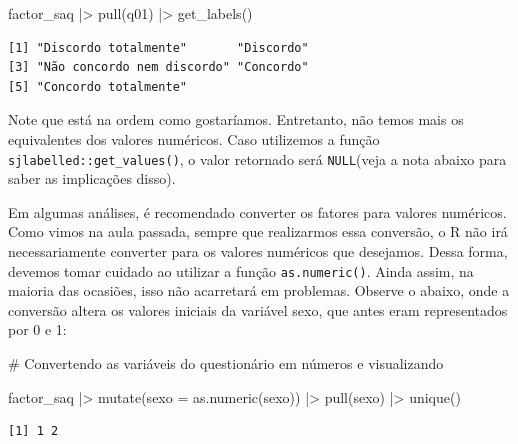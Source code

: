 \documentclass[
  letterpaper,
  DIV=11,
  numbers=noendperiod]{scrartcl}
\newenvironment{Shaded}{\begin{snugshade}}{\end{snugshade}}
\newcommand{\AttributeTok}[1]{\textcolor[rgb]{0.40,0.45,0.13}{#1}}
\newcommand{\CommentTok}[1]{\textcolor[rgb]{0.37,0.37,0.37}{#1}}
\newcommand{\FunctionTok}[1]{\textcolor[rgb]{0.28,0.35,0.67}{#1}}
\newcommand{\NormalTok}[1]{\textcolor[rgb]{0.00,0.23,0.31}{#1}}
\newcommand{\SpecialCharTok}[1]{\textcolor[rgb]{0.37,0.37,0.37}{#1}}
\begin{document}
\begin{Shaded}
\begin{Highlighting}[]
\NormalTok{factor\_saq }\SpecialCharTok{|\textgreater{}} 
  \FunctionTok{pull}\NormalTok{(q01) }\SpecialCharTok{|\textgreater{}} 
  \FunctionTok{get\_labels}\NormalTok{()}
\end{Highlighting}
\end{Shaded}

\begin{verbatim}
[1] "Discordo totalmente"       "Discordo"                 
[3] "Não concordo nem discordo" "Concordo"                 
[5] "Concordo totalmente"      
\end{verbatim}

Note que está na ordem como gostaríamos. Entretanto, não temos mais os
equivalentes dos valores numéricos. Caso utilizemos a função
\texttt{sjlabelled::get\_values()}, o valor retornado será
\texttt{NULL}(veja a nota abaixo para saber as implicações disso).

\begin{tcolorbox}[enhanced jigsaw, opacitybacktitle=0.6, bottomtitle=1mm, left=2mm, arc=.35mm, colback=white, breakable, colbacktitle=quarto-callout-warning-color!10!white, colframe=quarto-callout-warning-color-frame, opacityback=0, toprule=.15mm, toptitle=1mm, coltitle=black, titlerule=0mm, title=\textcolor{quarto-callout-warning-color}{\faExclamationTriangle}\hspace{0.5em}{Conversão de fator para valor numérico}, bottomrule=.15mm, rightrule=.15mm, leftrule=.75mm]

Em algumas análises, é recomendado converter os fatores para valores
numéricos. Como vimos na aula passada, sempre que realizarmos essa
conversão, o R não irá necessariamente converter para os valores
numéricos que desejamos. Dessa forma, devemos tomar cuidado ao utilizar
a função \texttt{as.numeric()}. Ainda assim, na maioria das ocasiões,
isso não acarretará em problemas. Observe o abaixo, onde a conversão
altera os valores iniciais da variável sexo, que antes eram
representados por 0 e 1:

\begin{Shaded}
\begin{Highlighting}[]
\CommentTok{\# Convertendo as variáveis do questionário em números e visualizando}

\NormalTok{factor\_saq }\SpecialCharTok{|\textgreater{}} 
  \FunctionTok{mutate}\NormalTok{(}\AttributeTok{sexo =} \FunctionTok{as.numeric}\NormalTok{(sexo)) }\SpecialCharTok{|\textgreater{}} 
  \FunctionTok{pull}\NormalTok{(sexo) }\SpecialCharTok{|\textgreater{}} 
  \FunctionTok{unique}\NormalTok{()}
\end{Highlighting}
\end{Shaded}

\begin{verbatim}
[1] 1 2
\end{verbatim}

\end{tcolorbox}
\end{document}
